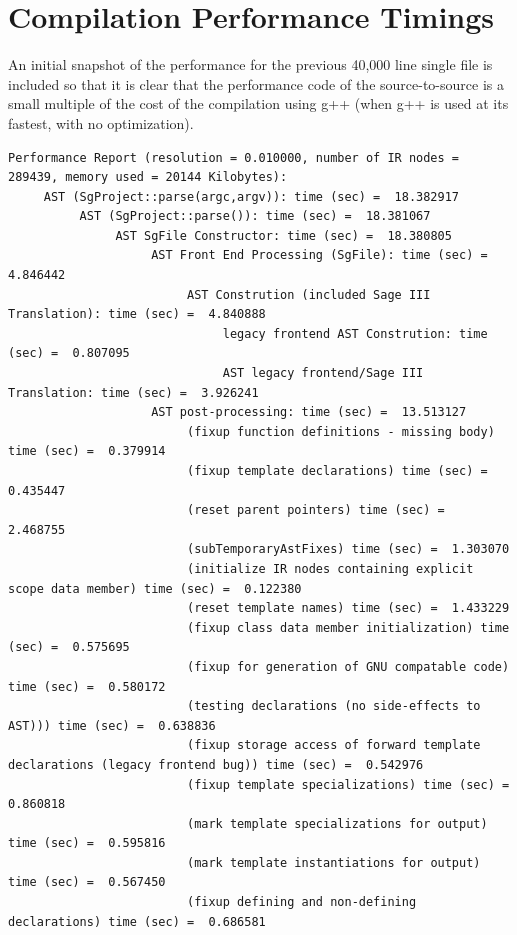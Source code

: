 
\section{Compilation Performance Timings}

    An initial snapshot of the performance for the previous 40,000 line
single file is included so that it is clear that the performance code of
the source-to-source is a small multiple of the cost of the compilation
using g++ (when g++ is used at its fastest, with no optimization).

{\mySmallestFontSize
\begin{verbatim}
Performance Report (resolution = 0.010000, number of IR nodes = 289439, memory used = 20144 Kilobytes):
     AST (SgProject::parse(argc,argv)): time (sec) =  18.382917
          AST (SgProject::parse()): time (sec) =  18.381067
               AST SgFile Constructor: time (sec) =  18.380805
                    AST Front End Processing (SgFile): time (sec) =  4.846442
                         AST Constrution (included Sage III Translation): time (sec) =  4.840888
                              legacy frontend AST Constrution: time (sec) =  0.807095
                              AST legacy frontend/Sage III Translation: time (sec) =  3.926241
                    AST post-processing: time (sec) =  13.513127
                         (fixup function definitions - missing body) time (sec) =  0.379914
                         (fixup template declarations) time (sec) =  0.435447
                         (reset parent pointers) time (sec) =  2.468755
                         (subTemporaryAstFixes) time (sec) =  1.303070
                         (initialize IR nodes containing explicit scope data member) time (sec) =  0.122380
                         (reset template names) time (sec) =  1.433229
                         (fixup class data member initialization) time (sec) =  0.575695
                         (fixup for generation of GNU compatable code) time (sec) =  0.580172
                         (testing declarations (no side-effects to AST))) time (sec) =  0.638836
                         (fixup storage access of forward template declarations (legacy frontend bug)) time (sec) =  0.542976
                         (fixup template specializations) time (sec) =  0.860818
                         (mark template specializations for output) time (sec) =  0.595816
                         (mark template instantiations for output) time (sec) =  0.567450
                         (fixup defining and non-defining declarations) time (sec) =  0.686581

\end{verbatim}}
